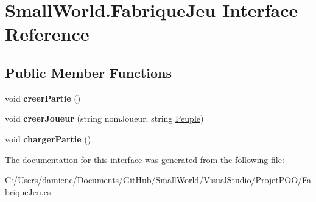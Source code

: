 \hypertarget{interface_small_world_1_1_fabrique_jeu}{\section{Small\-World.\-Fabrique\-Jeu Interface Reference}
\label{interface_small_world_1_1_fabrique_jeu}
}
\subsection*{Public Member Functions}
\begin{DoxyCompactItemize}
\item 
\hypertarget{interface_small_world_1_1_fabrique_jeu_a47c9d5ecca334a92c89a2e6ec8d862af}{void {\bfseries creer\-Partie} ()}\label{interface_small_world_1_1_fabrique_jeu_a47c9d5ecca334a92c89a2e6ec8d862af}

\item 
\hypertarget{interface_small_world_1_1_fabrique_jeu_a5fbfc360cc9d656f23725c33f6b0d383}{void {\bfseries creer\-Joueur} (string nom\-Joueur, string \hyperlink{class_small_world_1_1_peuple}{Peuple})}\label{interface_small_world_1_1_fabrique_jeu_a5fbfc360cc9d656f23725c33f6b0d383}

\item 
\hypertarget{interface_small_world_1_1_fabrique_jeu_a4d323908250275fa5b62eed7cad3f4ab}{void {\bfseries charger\-Partie} ()}\label{interface_small_world_1_1_fabrique_jeu_a4d323908250275fa5b62eed7cad3f4ab}

\end{DoxyCompactItemize}


The documentation for this interface was generated from the following file\-:\begin{DoxyCompactItemize}
\item 
C\-:/\-Users/damienc/\-Documents/\-Git\-Hub/\-Small\-World/\-Visual\-Studio/\-Projet\-P\-O\-O/Fabrique\-Jeu.\-cs\end{DoxyCompactItemize}
